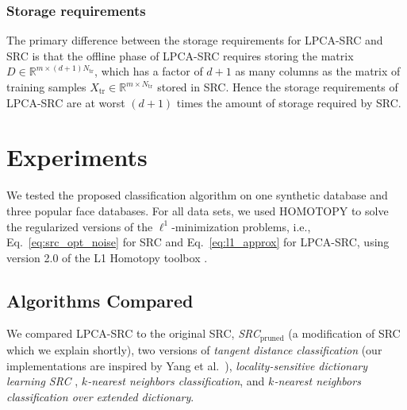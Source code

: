 \documentclass[review]{elsarticle}
\begin{document}
\subsubsection{Storage requirements}

The primary difference between the storage requirements for LPCA-SRC and SRC is that the offline phase of LPCA-SRC requires storing the matrix $D \in \mathbb{R}^{m \times (d+1)N_\mathrm{tr}}$, which has a factor of $d+1$ as many columns as the matrix of training samples $X_\mathrm{tr} \in \mathbb{R}^{m\times N_\mathrm{tr}}$ stored in SRC. Hence the storage requirements of LPCA-SRC are at worst $(d+1)$ times the amount of storage required by SRC.



\section{Experiments} \label{sec:exp_res}

We tested the proposed classification algorithm on one synthetic database and three popular face databases. For all data sets, we used HOMOTOPY to solve the regularized versions of the $\ell^1$-minimization problems, i.e., Eq.~\eqref{eq:src_opt_noise} for SRC and Eq.~\eqref{eq:l1_approx} for LPCA-SRC, using version 2.0 of the L1 Homotopy toolbox \cite{asif:hom}.

\subsection{Algorithms Compared}

We compared LPCA-SRC to the original SRC, \emph{SRC}$\mathit{_{\mathrm{pruned}}}$ (a modification of SRC which we explain shortly), two versions of \emph{tangent distance classification} (our implementations are inspired by Yang et al.\ \cite{yan:ltd}), \emph{locality-sensitive dictionary learning SRC} \cite{wei:lsdl}, $\mathit{k}$\emph{-nearest neighbors classification}, and $\mathit{k}$\emph{-nearest neighbors classification over extended dictionary}. 
\end{document}
